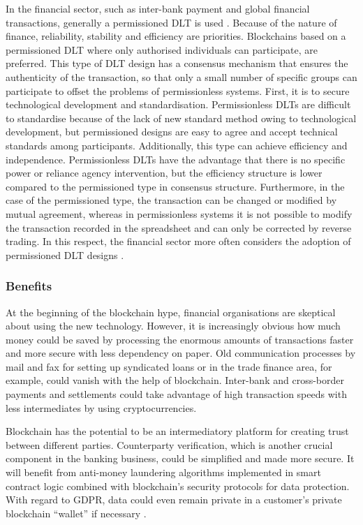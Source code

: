 In the financial sector, such as inter-bank payment and global financial transactions, generally a permissioned DLT is used \cite{yoo2017blockchain}. Because of the nature of finance, reliability, stability and efficiency are priorities. Blockchains based on a permissioned DLT where only authorised individuals can participate, are preferred. This type of DLT design has a consensus mechanism that ensures the authenticity of the transaction, so that only a small number of specific groups can participate to offset the problems of permissionless systems. First, it is to secure technological development and standardisation. Permissionless DLTs are difficult to standardise because of the lack of new standard method owing to technological development, but permissioned designs are easy to agree and accept technical standards among participants. Additionally, this type can achieve efficiency and independence. Permissionless DLTs have the advantage that there is no specific power or reliance agency intervention, but the efficiency structure is lower compared to the permissioned type in consensus structure. Furthermore, in the case of the permissioned type, the transaction can be changed or modified by mutual agreement, whereas in permissionless systems it is not possible to modify the transaction recorded in the spreadsheet and can only be corrected by reverse trading. In this respect, the financial sector more often considers the adoption of permissioned DLT designs \cite{yoo2017blockchain}.

\subsubsection{Benefits}
\label{sssec:f-benefits}

At the beginning of the blockchain hype, financial organisations are skeptical about using the new technology. However, it is increasingly obvious how much money could be saved by processing the enormous amounts of transactions faster and more secure with less dependency on paper. Old communication processes by mail and fax for setting up syndicated loans or in the trade finance area, for example, could vanish with the help of blockchain. Inter-bank and cross-border payments and settlements could take advantage of high transaction speeds with less intermediates by using cryptocurrencies.

Blockchain has the potential to be an intermediatory platform for creating trust between different parties. Counterparty verification, which is another crucial component in the banking business, could be simplified and made more secure. It will benefit from anti-money laundering algorithms implemented in smart contract logic combined with blockchain’s security protocols for data protection. With regard to GDPR, data could even remain private in a customer’s private blockchain “wallet” if necessary \cite{bettio2019hyperledger}.

